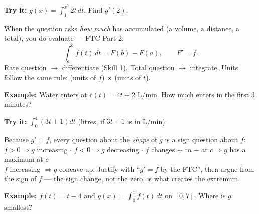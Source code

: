 \documentclass[12pt]{article}
\begin{document}
\begin{tryitbox}
\textbf{Try it:} \quad $g(x) = \int_1^{x^3} 2t\,dt$. Find $g'(2)$.\\[2pt]
\end{tryitbox}


\begin{formulabox}
When the question asks \emph{how much} has accumulated (a volume, a distance, a total), you
do evaluate --- FTC Part 2:
\[ \int_a^{b} f(t)\,dt = F(b) - F(a), \qquad F' = f. \]
Rate question $\rightarrow$ differentiate (Skill 1). Total question $\rightarrow$ integrate.
Units follow the same rule: (units of $f$) $\times$ (units of $t$).
\end{formulabox}

\begin{examplebox}
\textbf{Example:} \quad Water enters at $r(t) = 4t + 2$ L/min. How much enters in the first
$3$ minutes?
\end{examplebox}

\begin{tryitbox}
\textbf{Try it:} \quad $\int_0^{4}\left(3t + 1\right)dt$ (litres, if $3t+1$ is
in L/min).\\[2pt]
\end{tryitbox}


\begin{formulabox}
Because $g' = f$, every question about the \emph{shape} of $g$ is a sign question about $f$:\\[2pt]
$f > 0 \Rightarrow g$ increasing \quad $\cdot$ \quad $f < 0 \Rightarrow g$ decreasing \quad
$\cdot$ \quad $f$ changes $+$ to $-$ at $c \Rightarrow g$ has a maximum at $c$\\[2pt]
$f$ increasing $\Rightarrow g$ concave up. Justify with ``$g' = f$ by the FTC'', then argue
from the sign of $f$ --- the sign change, not the zero, is what creates the extremum.
\end{formulabox}

\begin{examplebox}
\textbf{Example:} \quad $f(t) = t - 4$ and $g(x) = \int_0^{x} f(t)\,dt$ on
$[0,7]$. Where is $g$ smallest?
\end{examplebox}
\end{document}
